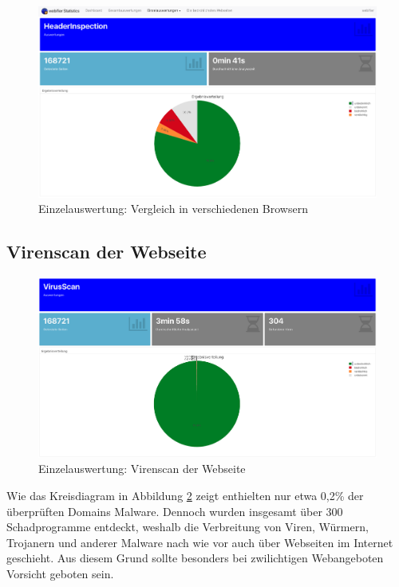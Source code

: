 \begin{figure}[H]
  \centering
  \includegraphics[width=15cm]{images/stats/headerinspection}
  \caption{Einzelauswertung: Vergleich in verschiedenen Browsern\protect\footnotemark}
  \label{fig:analyse-headerinspection}
\end{figure}


\subsection{Virenscan der Webseite}
\begin{figure}[H]
  \centering
  \includegraphics[width=15cm]{images/stats/virusscan}
  \caption{Einzelauswertung: Virenscan der Webseite\protect\footnotemark}
  \label{fig:analyse-virusscan}
\end{figure}

Wie das Kreisdiagram in Abbildung \ref{fig:analyse-virusscan} zeigt enthielten nur etwa 0,2\% der überprüften Domains Malware. Dennoch wurden insgesamt über 300 Schadprogramme entdeckt, weshalb die Verbreitung von Viren, Würmern, Trojanern und anderer Malware nach wie vor auch über Webseiten im Internet geschieht. Aus diesem Grund sollte besonders bei zwilichtigen Webangeboten Vorsicht geboten sein.


